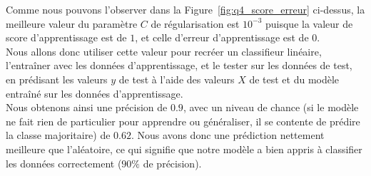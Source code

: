 \documentclass{article}
\begin{document}
Comme nous pouvons l'observer dans la Figure~\ref{fig:q4_score_erreur} ci-dessus, la meilleure valeur du paramètre $C$ de régularisation est $10^{-3}$ puisque la valeur de score d'apprentissage est de $1$, et celle d'erreur d'apprentissage est de $0$.\\

Nous allons donc utiliser cette valeur pour recréer un classifieur linéaire, l'entraîner avec les données d'apprentissage, et le tester sur les données de test, en prédisant les valeurs $y$ de test à l'aide des valeurs $X$ de test et du modèle entraîné sur les données d'apprentissage.\\
Nous obtenons ainsi une précision de $0.9$, avec un niveau de chance (si le modèle ne fait rien de particulier pour apprendre ou généraliser, il se contente de prédire la classe majoritaire) de $0.62$. Nous avons donc une prédiction nettement meilleure que l'aléatoire, ce qui signifie que notre modèle a bien appris à classifier les données correctement ($90\%$ de précision).\\
\end{document}

